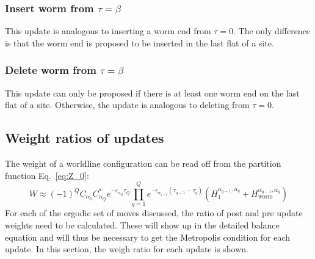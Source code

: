 \documentclass[12pt, two sided]{article}
\begin{document}
    \subsubsection{Insert worm from $\tau=\beta$}
    
    This update is analogous to inserting a worm end from $\tau=0$. The only difference is that the worm end is proposed to be inserted in the last flat of a site.
    
    \subsubsection{Delete worm from $\tau=\beta$}
    
    This update can only be proposed if there is at least one worm end on the last flat of a site. Otherwise, the update is analogous to deleting from $\tau=0$.
    
    \subsection{Weight ratios of updates}
    
    The weight of a worldline configuration can be read off from the partition function Eq.~\eqref{eq:Z_0}:
    \begin{equation}
    W \approx (-1)^{Q}  C_{\alpha_0} C_{\alpha_Q}^* e^{-\epsilon_{\alpha_Q} \tau_Q} \prod_{q=1}^Q e^{-\epsilon_{\alpha_{q-1}}(\tau_{q-1}-\tau_q)} 
(H_1^{\alpha_{q-1},\alpha_q} + H_\mathrm{worm}^{\alpha_{q-1},\alpha_q})
    \end{equation}
    For each of the ergodic set of moves discussed, the ratio of post and pre update weights need to be calculated. These will show up in the detailed balance equation and will thus be necessary to get the Metropolis condition for each update. In this section, the weigh ratio for each update is shown.
    
\end{document}
